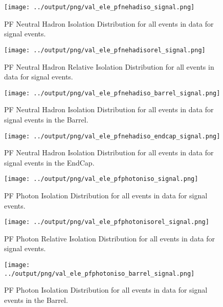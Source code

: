 \documentclass[11pt]{book}
\begin{document}
\begin{figure}[htb]
\centering
\texttt{[image: ../output/png/val\_ele\_pfnehadiso\_signal.png]}
\caption{PF Neutral Hadron Isolation Distribution for all events in data for signal events.}
\label{fig:val_ele_pfnehadiso_signal}
\end{figure}

\begin{figure}[htb]
\centering
\texttt{[image: ../output/png/val\_ele\_pfnehadisorel\_signal.png]}
\caption{PF Neutral Hadron Relative Isolation Distribution for all events in data for signal events.}
\label{fig:val_ele_pfnehadisorel_signal}
\end{figure}

\begin{figure}[htb]
\centering
\texttt{[image: ../output/png/val\_ele\_pfnehadiso\_barrel\_signal.png]}
\caption{PF Neutral Hadron Isolation Distribution for all events in data for signal events in the Barrel.}
\label{fig:val_ele_pfnehadiso_barrel_signal}
\end{figure}

\begin{figure}[htb]
\centering
\texttt{[image: ../output/png/val\_ele\_pfnehadiso\_endcap\_signal.png]}
\caption{PF Neutral Hadron Isolation Distribution for all events in data for signal events in the EndCap.}
\label{fig:val_ele_pfnehadiso_endcap_signal}
\end{figure}

\begin{figure}[htb]
\centering
\texttt{[image: ../output/png/val\_ele\_pfphotoniso\_signal.png]}
\caption{PF Photon Isolation Distribution for all events in data for signal events.}
\label{fig:val_ele_pfphotoniso_signal}
\end{figure}

\begin{figure}[htb]
\centering
\texttt{[image: ../output/png/val\_ele\_pfphotonisorel\_signal.png]}
\caption{PF Photon Relative Isolation Distribution for all events in data for signal events.}
\label{fig:val_ele_pfphotonisorel_signal}
\end{figure}

\begin{figure}[htb]
\centering
\texttt{[image: ../output/png/val\_ele\_pfphotoniso\_barrel\_signal.png]}
\caption{PF Photon Isolation Distribution for all events in data for signal events in the Barrel.}
\label{fig:val_ele_pfphotoniso_barrel_signal}
\end{figure}
\end{document}
